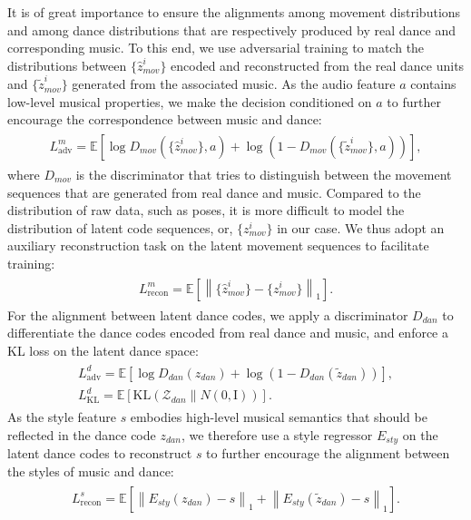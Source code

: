 \documentclass{article}
\begin{document}
It is of great importance to ensure the alignments among movement distributions and among dance distributions that are respectively produced by real dance and corresponding music.  
To this end, we use adversarial training to match the distributions between ${\{\hat{z}_{mov}^i\}}$  encoded and reconstructed from the real dance units and ${\{\tilde{z}_{mov}^i\}}$ generated from the associated music.
As the audio feature $a$ contains low-level musical properties, we make the decision conditioned on $a$ to further encourage the correspondence between music and dance:
\begin{align}
\begin{split}
L^m_{\mathrm{adv}} = \mathbb{E}[\log{D_{mov}(\{\hat{z}_{mov}^i\}, a)} + \log{(1 - D_{mov}(\{\tilde{z}_{mov}^i\}, a))}], \end{split}
\end{align}
where $D_{mov}$ is the discriminator that tries to distinguish between the movement sequences that are generated from real dance and music. 
Compared to the distribution of raw data, such as poses, it is more difficult to model the distribution of latent code sequences, or, $\{z_{mov}^i\}$ in our case. We thus adopt an auxiliary reconstruction task on the latent movement sequences to facilitate training: 
\begin{align}
\begin{split}
L^m_{\mathrm{recon}} = \mathbb{E}[\left\lVert{\{\hat{z}_{mov}^i\} - \{z_{mov}^i\}}\right\rVert_{1}].
\end{split}
\end{align}
For the alignment between latent dance codes, we apply a discriminator $D_{dan}$ to differentiate the dance codes encoded from real dance and music, and enforce a KL loss on the latent dance space:
\begin{align}
\begin{gathered}
L^d_{\mathrm{adv}} = \mathbb{E}[\log{D_{dan}(z_{dan})} + \log{(1 - D_{dan}(\tilde{z}_{dan}))}],\\
L^d_{\mathrm{KL}} = \mathbb{E}[\mathrm{KL}(\mathcal{Z}_{dan}\|N(0, \mathrm{I}))].
\end{gathered}
\end{align}
As the style feature $s$ embodies high-level musical semantics that should be reflected in the dance code $z_{dan}$, we therefore use a style regressor $E_{sty}$ on the latent dance codes to reconstruct $s$ to further encourage the alignment between the styles of music and dance:
\begin{align}
\begin{split}
L^s_{\mathrm{recon}} = \mathbb{E}[\left\lVert E_{sty}(z_{dan}) - s \right\rVert_{1} + \left\lVert E_{sty}(\tilde{z}_{dan}) - s \right\rVert_{1}].
\end{split}
\end{align}
\end{document}
